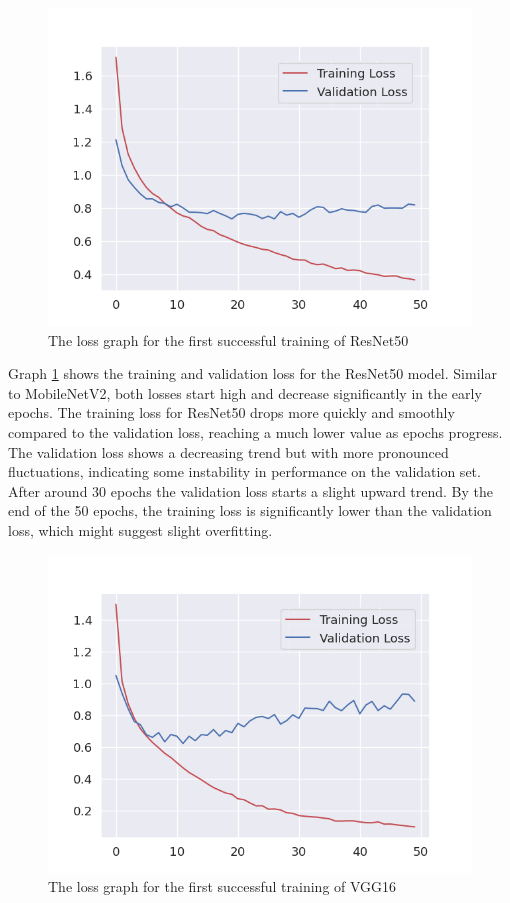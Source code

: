 \begin{figure}[H]
    \centering{}
    \includegraphics[scale=0.5]{fed_images/train_loss_ResNet50.png}
    \caption{The loss graph for the first successful training of ResNet50}
    \label{figure:loss_rn50}
\end{figure}

Graph \ref{figure:loss_rn50} shows the training and validation loss for the ResNet50 model. Similar to MobileNetV2, both losses start high and decrease significantly in the early epochs. The training loss for ResNet50 drops more quickly and smoothly compared to the validation loss, reaching a much lower value as epochs progress. The validation loss shows a decreasing trend but with more pronounced fluctuations, indicating some instability in performance on the validation set. After around 30 epochs the validation loss starts a slight upward trend. By the end of the 50 epochs, the training loss is significantly lower than the validation loss, which might suggest slight overfitting.

\begin{figure}[H]
    \centering{}
    \includegraphics[scale=0.5]{fed_images/train_loss_VGG16.png}
    \caption{The loss graph for the first successful training of VGG16}
    \label{figure:loss_vgg16}
\end{figure}

